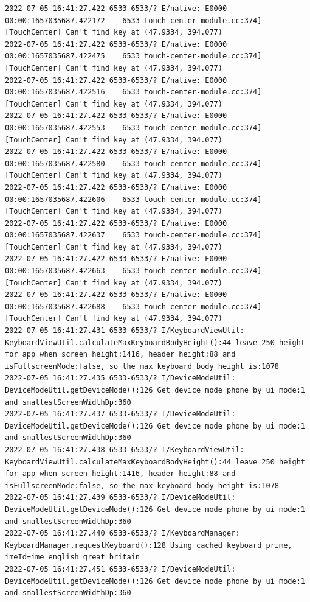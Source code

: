 \documentclass[a4paper,12pt]{book}
\begin{document}
\begin{lstlisting}
2022-07-05 16:41:27.422 6533-6533/? E/native: E0000 00:00:1657035687.422172    6533 touch-center-module.cc:374] [TouchCenter] Can't find key at (47.9334, 394.077)
2022-07-05 16:41:27.422 6533-6533/? E/native: E0000 00:00:1657035687.422475    6533 touch-center-module.cc:374] [TouchCenter] Can't find key at (47.9334, 394.077)
2022-07-05 16:41:27.422 6533-6533/? E/native: E0000 00:00:1657035687.422516    6533 touch-center-module.cc:374] [TouchCenter] Can't find key at (47.9334, 394.077)
2022-07-05 16:41:27.422 6533-6533/? E/native: E0000 00:00:1657035687.422553    6533 touch-center-module.cc:374] [TouchCenter] Can't find key at (47.9334, 394.077)
2022-07-05 16:41:27.422 6533-6533/? E/native: E0000 00:00:1657035687.422580    6533 touch-center-module.cc:374] [TouchCenter] Can't find key at (47.9334, 394.077)
2022-07-05 16:41:27.422 6533-6533/? E/native: E0000 00:00:1657035687.422606    6533 touch-center-module.cc:374] [TouchCenter] Can't find key at (47.9334, 394.077)
2022-07-05 16:41:27.422 6533-6533/? E/native: E0000 00:00:1657035687.422637    6533 touch-center-module.cc:374] [TouchCenter] Can't find key at (47.9334, 394.077)
2022-07-05 16:41:27.422 6533-6533/? E/native: E0000 00:00:1657035687.422663    6533 touch-center-module.cc:374] [TouchCenter] Can't find key at (47.9334, 394.077)
2022-07-05 16:41:27.422 6533-6533/? E/native: E0000 00:00:1657035687.422688    6533 touch-center-module.cc:374] [TouchCenter] Can't find key at (47.9334, 394.077)
2022-07-05 16:41:27.431 6533-6533/? I/KeyboardViewUtil: KeyboardViewUtil.calculateMaxKeyboardBodyHeight():44 leave 250 height for app when screen height:1416, header height:88 and isFullscreenMode:false, so the max keyboard body height is:1078
2022-07-05 16:41:27.435 6533-6533/? I/DeviceModeUtil: DeviceModeUtil.getDeviceMode():126 Get device mode phone by ui mode:1 and smallestScreenWidthDp:360
2022-07-05 16:41:27.437 6533-6533/? I/DeviceModeUtil: DeviceModeUtil.getDeviceMode():126 Get device mode phone by ui mode:1 and smallestScreenWidthDp:360
2022-07-05 16:41:27.438 6533-6533/? I/KeyboardViewUtil: KeyboardViewUtil.calculateMaxKeyboardBodyHeight():44 leave 250 height for app when screen height:1416, header height:88 and isFullscreenMode:false, so the max keyboard body height is:1078
2022-07-05 16:41:27.439 6533-6533/? I/DeviceModeUtil: DeviceModeUtil.getDeviceMode():126 Get device mode phone by ui mode:1 and smallestScreenWidthDp:360
2022-07-05 16:41:27.440 6533-6533/? I/KeyboardManager: KeyboardManager.requestKeyboard():128 Using cached keyboard prime, imeId=ime_english_great_britain
2022-07-05 16:41:27.451 6533-6533/? I/DeviceModeUtil: DeviceModeUtil.getDeviceMode():126 Get device mode phone by ui mode:1 and smallestScreenWidthDp:360

\end{lstlisting}
\end{document}
